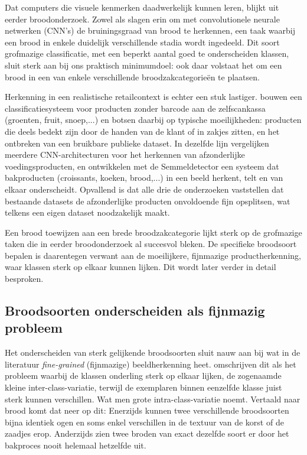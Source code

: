 Dat computers die visuele kenmerken daadwerkelijk kunnen leren, blijkt uit eerder
broodonderzoek. Zowel \textcite{Cotrim2020} als \textcite{Tantiphanwadi2022} slagen
erin om met convolutionele neurale netwerken (CNN's) de bruiningsgraad van brood te
herkennen, een taak waarbij een brood in enkele duidelijk verschillende stadia wordt
ingedeeld. Dit soort grofmazige classificatie, met een beperkt aantal goed te
onderscheiden klassen, sluit sterk aan bij ons praktisch minimumdoel: ook daar
volstaat het om een brood in een van enkele verschillende
broodzakcategorieën te plaatsen.


Herkenning in een realistische retailcontext is echter een stuk
lastiger. \textcite{Ciapas2023} bouwen een classificatiesysteem voor producten zonder
barcode aan de zelfscankassa (groenten, fruit, snoep,...) en botsen daarbij op typische moeilijkheden: producten
die deels bedekt zijn door de handen van de klant of in zakjes
zitten, en het ontbreken van een bruikbare publieke dataset. In dezelfde lijn
vergelijken \textcite{Boyd2024} meerdere CNN-architecturen voor het herkennen van
afzonderlijke voedingsproducten, en ontwikkelen \textcite{Schmitt2025} met de
Semmeldetector een systeem dat bakproducten (croissants, koeken, brood,...) in een beeld herkent, telt en van elkaar
onderscheidt. Opvallend is dat alle drie de onderzoeken vaststellen dat
bestaande datasets de afzonderlijke producten onvoldoende fijn opsplitsen, wat telkens een eigen dataset noodzakelijk maakt.


Een brood toewijzen aan een brede broodzakcategorie lijkt sterk op de grofmazige taken die in
eerder broodonderzoek al succesvol bleken. De specifieke broodsoort bepalen is
daarentegen verwant aan de moeilijkere, fijnmazige productherkenning, waar klassen
sterk op elkaar kunnen lijken. Dit wordt later verder in detail besproken.


\subsection{Broodsoorten onderscheiden als fijnmazig probleem}


Het onderscheiden van sterk gelijkende broodsoorten sluit nauw aan bij wat in de
literatuur \emph{fine-grained} (fijnmazige) beeldherkenning heet. \textcite{Wei2022}
omschrijven dit als het probleem waarbij de klassen onderling sterk op elkaar lijken, de zogenaamde kleine inter-class-variatie, terwijl de exemplaren binnen
eenzelfde klasse juist sterk kunnen verschillen. Wat men grote intra-class-variatie
noemt. Vertaald naar brood komt dat neer op dit:
Enerzijds kunnen twee verschillende broodsoorten bijna identiek ogen en soms enkel
verschillen in de textuur van de korst of de zaadjes erop. Anderzijds zien twee broden
van exact dezelfde soort er door het bakproces nooit helemaal hetzelfde uit.


